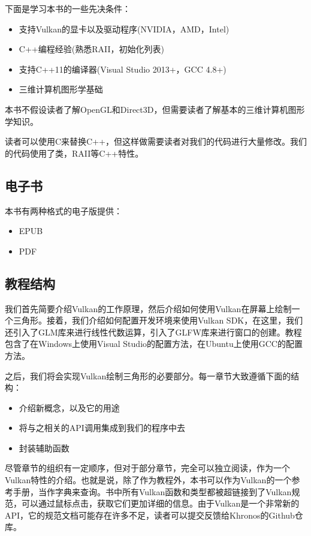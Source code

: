\documentclass{ctexart}
\begin{document}
下面是学习本书的一些先决条件：

\begin{itemize}
	\item 支持Vulkan的显卡以及驱动程序(NVIDIA，AMD，Intel)
	\item C++编程经验(熟悉RAII，初始化列表)
	\item 支持C++11的编译器(Visual Studio 2013+，GCC 4.8+)
	\item 三维计算机图形学基础
\end{itemize}


本书不假设读者了解OpenGL和Direct3D，但需要读者了解基本的三维计算机图形学知识。

读者可以使用C来替换C++，但这样做需要读者对我们的代码进行大量修改。我们的代码使用了类，RAII等C++特性。

\subsection{电子书}

本书有两种格式的电子版提供：

\begin{itemize}
	\item EPUB
	\item PDF
\end{itemize}


\subsection{教程结构}

我们首先简要介绍Vulkan的工作原理，然后介绍如何使用Vulkan在屏幕上绘制一个三角形。接着，我们介绍如何配置开发环境来使用Vulkan SDK，在这里，我们还引入了GLM库来进行线性代数运算，引入了GLFW库来进行窗口的创建。教程包含了在Windows上使用Visual Studio的配置方法，在Ubuntu上使用GCC的配置方法。

之后，我们将会实现Vulkan绘制三角形的必要部分。每一章节大致遵循下面的结构：

\begin{itemize}
	\item 介绍新概念，以及它的用途
	\item 将与之相关的API调用集成到我们的程序中去
	\item 封装辅助函数
\end{itemize}

尽管章节的组织有一定顺序，但对于部分章节，完全可以独立阅读，作为一个Vulkan特性的介绍。也就是说，除了作为教程外，本书可以作为Vulkan的一个参考手册，当作字典来查询。书中所有Vulkan函数和类型都被超链接到了Vulkan规范，可以通过鼠标点击，获取它们更加详细的信息。由于Vulkan是一个非常新的API，它的规范文档可能存在许多不足，读者可以提交反馈给Khronos的Github仓库。
\end{document}
